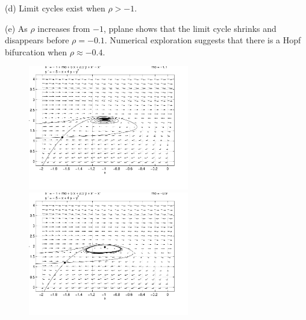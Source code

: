 \documentclass{ximera}
\begin{document}
\begin{computerExercise}
\begin{solution}
(d) Limit cycles exist when $\rho>-1$.

(e)  As $\rho$ increases from $-1$, {\sf pplane} shows that the limit 
cycle shrinks and disappears before $\rho=-0.1$. Numerical exploration
suggests that there is a Hopf bifurcation when $\rho\approx -0.4$.

\begin{figure}[htb]
                       \centerline{%
                       \includegraphics[width=2.75in]{exfigure/9-7-4a.pdf}
                       \includegraphics[width=2.75in]{exfigure/9-7-4b.pdf}}
\end{figure}


\end{solution}
\end{computerExercise}
\end{document}
